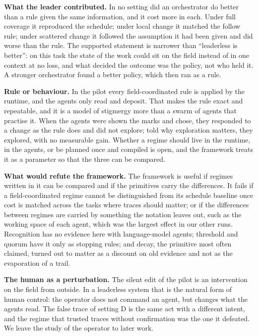 \documentclass[10pt,twocolumn]{article}
\begin{document}
\textbf{What the leader contributed.} In no setting did an orchestrator do better than a rule given the same information, and it cost more in each. Under full coverage it reproduced the schedule; under local change it matched the follow rule; under scattered change it followed the assumption it had been given and did worse than the rule. The supported statement is narrower than ``leaderless is better'': on this task the state of the work could sit on the field instead of in one context at no loss, and what decided the outcome was the policy, not who held it. A stronger orchestrator found a better policy, which then ran as a rule.

\textbf{Rule or behaviour.} In the pilot every field-coordinated rule is applied by the runtime, and the agents only read and deposit. That makes the rule exact and repeatable, and it is a model of stigmergy more than a swarm of agents that practise it. When the agents were shown the marks and chose, they responded to a change as the rule does and did not explore; told why exploration matters, they explored, with no measurable gain. Whether a regime should live in the runtime, in the agents, or be planned once and compiled is open, and the framework treats it as a parameter so that the three can be compared.

\textbf{What would refute the framework.} The framework is useful if regimes written in it can be compared and if the primitives carry the differences. It fails if a field-coordinated regime cannot be distinguished from its schedule baseline once cost is matched across the tasks where traces should matter; or if the differences between regimes are carried by something the notation leaves out, such as the working space of each agent, which was the largest effect in our other runs. Recognition has no evidence here with language-model agents; threshold and quorum have it only as stopping rules; and decay, the primitive most often claimed, turned out to matter as a discount on old evidence and not as the evaporation of a trail.

\textbf{The human as a perturbation.} The silent edit of the pilot is an intervention on the field from outside. In a leaderless system that is the natural form of human control: the operator does not command an agent, but changes what the agents read. The false trace of setting D is the same act with a different intent, and the regime that trusted traces without confirmation was the one it defeated. We leave the study of the operator to later work.
\end{document}
